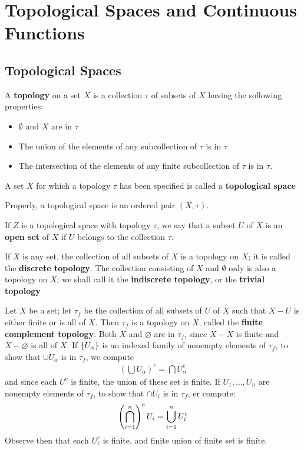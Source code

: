\chapter{Topological Spaces and Continuous Functions}
\section{Topological Spaces}
\begin{define}
	A \textbf{topology} on a set $X$ is a collection $\tau$ of subsets of $X$ having the sollowing properties:
	\begin{itemize}
		\item $\emptyset \textrm{ and } X $ are in $\tau$ 
		\item The union of the elements of any subcollection of $ \tau $ is in $ \tau $
		\item The intersection of the elements of any finite subcollection of $ \tau $ is in $ \tau $.
	\end{itemize}
	A set $ X $ for which a topology $ \tau $ has been specified is called a \textbf{topological space}
\end{define}
Properly, a topological space is an ordered pair $ (X, \tau) $.

If $Z$ is a topological space with topology $ \tau $, we say that a subset $U$ of $X$ is an \textbf{open set} of $X$ if $U$ belongs to the collection $ \tau $. 

\begin{exm}
	If $X$ is any set, the collection of all subsets of $X$ is a topology on $X$; it is called the \textbf{discrete topology}. The collection consisting of $X$ and $\emptyset$ only is also a topology on $X$; we shall call it the \textbf{indiscrete topology}, or the \textbf{trivial topology}
\end{exm}
\begin{exm}
	Let $X$ be a set; let $\tau_f $ be the collection of all subsets of $U$ of $X$ such that $ X-U$ is either finite or is all of $X$. Then $\tau_f$ is a topology on $X$, called the \textbf{finite complement topology}. Both $X$ and $\varnothing$ are in $ \tau_f$, since $ X-X $ is finite and $ X - \varnothing $ is all of $X$. If $ \left\lbrace U_\alpha \right\rbrace $ is an indexed family of nonempty elements of $ \tau_f $, to show that $ \cup U_\alpha $ is in $\tau_f$, we compute
	\begin{align*}
	(\bigcup U_\alpha)^c = \bigcap U_{\alpha}^c
	\end{align*}
	and since each $U^c$ is finite, the union of these set is finite. If $ U_1, \ldots, U_n$ are nonempty elements of $ \tau_f$, to show that $ \cap U_i $ is in $ \tau_f$, er compute:
	\begin{align*}
		\left( \bigcap_{i=1}^n \right)^c U_i = \bigcup_{i=1}^n U_i^c
	\end{align*}
	Observe then that each $U_i^c $ is finite, and finite union of finite set is finite.
\end{exm}


